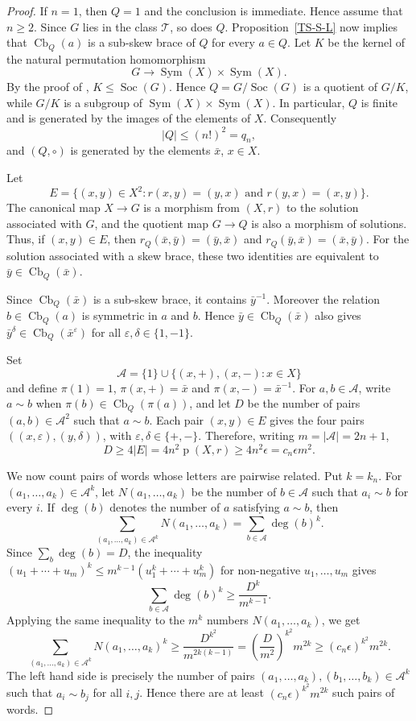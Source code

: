 \documentclass[10pt,a4paper]{amsart}
\numberwithin{equation}{section}
\newcommand{\Cb}{\operatorname{Cb} }
\newcommand{\Soc}{\operatorname{Soc} }
\begin{document}
\begin{proof}
 If $n=1$, then $Q=1$ and the conclusion is immediate. Hence assume that $n\geqslant2$.
 Since $G$ lies in the class $\mathcal{T}$, so does $Q$. Proposition~\ref{TS-S-L} now implies that $\Cb_Q(a)$ is a sub-skew brace of $Q$ for every $a\in Q$.
Let $K$ be the kernel of the natural permutation homomorphism
$$
G\longrightarrow \operatorname{Sym}(X)\times\operatorname{Sym}(X).
$$
By the proof of \cite[Theorem~3.11]{Bac18}, $K\leqslant\Soc(G)$. Hence $Q=G/\Soc(G)$ is a quotient of $G/K$, while $G/K$ is a subgroup of
$\operatorname{Sym}(X)\times\operatorname{Sym}(X)$. In particular, $Q$ is finite and is generated by
the images of the elements of $X$. Consequently
$$
|Q|\leqslant(n!)^2=q_n,
$$
and  $(Q, \circ)$ is generated by the elements
$\bar x$, $x\in X$.

Let
$$
E=\{(x,y)\in X^2:r(x,y)=(y,x)\text{ and }r(y,x)=(x,y)\}.
$$
The canonical map $X\to G$ is a morphism from $(X,r)$ to the solution
associated with $G$, and the quotient map $G\to Q$ is also a morphism of
solutions. Thus, if $(x,y)\in E$, then
$r_Q(\bar x,\bar y)=(\bar y,\bar x)$ and
$r_Q(\bar y,\bar x)=(\bar x,\bar y)$. For the solution associated with a
skew brace, these two identities are equivalent to
$\bar y\in\Cb_Q(\bar x)$.

Since $\Cb_Q(\bar x)$ is a sub-skew brace, it contains $\bar y^{-1}$.
Moreover the relation $b\in\Cb_Q(a)$ is symmetric in $a$ and $b$. Hence
$\bar y\in\Cb_Q(\bar x)$ also gives
$\bar y^{\delta}\in\Cb_Q(\bar x^{\varepsilon})$ for all
$\varepsilon,\delta\in\{1,-1\}$.


Set
$$
\mathcal A=\{1\}\cup\{(x,+),(x,-):x\in X\}
$$
and define $\pi(1)=1$, $\pi(x,+)=\bar x$ and
$\pi(x,-)=\bar x^{-1}$. For $a,b\in\mathcal A$, write $a\sim b$ when
$\pi(b)\in\Cb_Q(\pi(a))$, and let $D$ be the number of pairs
$(a,b)\in\mathcal A^2$ such that $a\sim b$. Each pair $(x,y)\in E$ gives
the four pairs $((x,\varepsilon),(y,\delta))$, with
$\varepsilon,\delta\in\{+,-\}$. Therefore, writing $m=|\mathcal A|=2n+1$,
$$
D\geqslant4|E|=4n^2\operatorname{p}(X,r)\geqslant4n^2\epsilon
=c_n\epsilon m^2.
$$

We now count pairs of words whose letters are pairwise related. Put $k=k_n$.
For $(a_1,\ldots,a_k)\in\mathcal A^k$, let
$N(a_1,\ldots,a_k)$ be the number of $b\in\mathcal A$ such that
$a_i\sim b$ for every $i$. If $\deg(b)$ denotes the number of $a$ satisfying
$a\sim b$, then
$$
\sum_{(a_1,\ldots,a_k)\in\mathcal A^k}N(a_1,\ldots,a_k)
=\sum_{b\in\mathcal A}\deg(b)^k.
$$
Since $\sum_b\deg(b)=D$, the inequality
$(u_1+\cdots+u_m)^k\leqslant m^{k-1}(u_1^k+\cdots+u_m^k)$ for non-negative
$u_1,\ldots,u_m$ gives
$$
\sum_{b\in\mathcal A}\deg(b)^k\geqslant\frac{D^k}{m^{k-1}}.
$$
Applying the same inequality to the $m^k$ numbers
$N(a_1,\ldots,a_k)$, we get
$$
\sum_{(a_1,\ldots,a_k)\in\mathcal A^k}N(a_1,\ldots,a_k)^k
\geqslant
\frac{D^{k^2}}{m^{2k(k-1)}}
=
\left(\frac{D}{m^2}\right)^{k^2}m^{2k}
\geqslant(c_n\epsilon)^{k^2}m^{2k}.
$$
The left hand side is precisely the number of pairs
$(a_1,\ldots,a_k),(b_1,\ldots,b_k)\in\mathcal A^k$ such that
$a_i\sim b_j$ for all $i,j$. Hence there are at least
$(c_n\epsilon)^{k^2}m^{2k}$ such pairs of words.


\end{proof}
\end{document}
